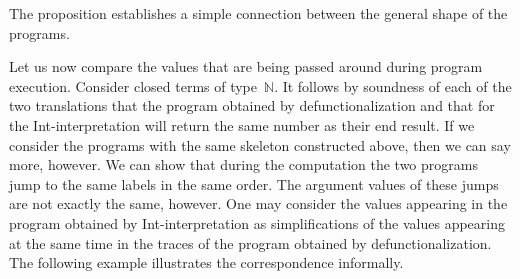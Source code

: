 \documentclass{LMCS}
\theoremstyle{definition}
\theoremstyle{plain}
\newcommand{\NN}{\mathbb{N}}
\begin{document}
\noindent The proposition establishes a simple connection between the general shape
of the programs.

Let us now compare the values that are being passed around during program execution.
Consider closed terms of type~$\NN$. 
It follows by soundness of each of the two translations that 
the program obtained by defunctionalization and 
that for the Int-interpretation will return the same number as their end result.
If we consider the programs with the same skeleton constructed above,
then we can say more, however. We can show that during the computation
the two programs jump to the same labels in the same order. 
The argument values of these jumps are not exactly the
same, however. One may consider the values 
appearing in the program obtained by 
Int-interpretation as simplifications of the values
appearing at the same time in the traces of the program obtained by
defunctionalization. 
The following example illustrates the correspondence informally.
\end{document}
